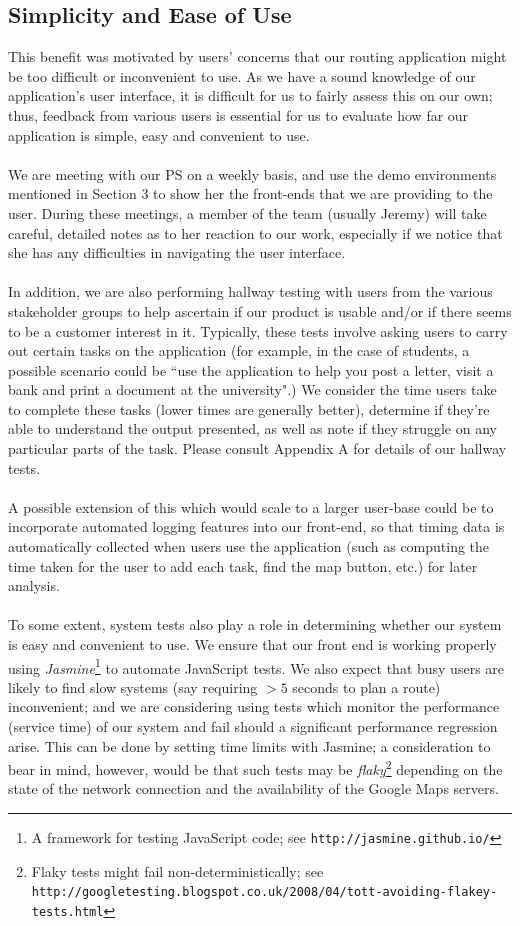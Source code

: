 \documentclass[a4paper, 10pt]{article}
\begin{document}
\subsection{Simplicity and Ease of Use}
This benefit was motivated by users' concerns that our routing application might be too difficult or inconvenient to use. As we have a sound knowledge of our application's user interface, it is difficult for us to fairly assess this on our own; thus, feedback from various users is essential for us to evaluate how far our application is simple, easy and convenient to use. \\\\
We are meeting with our PS on a weekly basis, and use the demo environments mentioned in Section 3 to show her the front-ends that we are providing to the user. During these meetings, a member of the team (usually Jeremy) will take careful, detailed notes as to her reaction to our work, especially if we notice that she has any difficulties in navigating the user interface. \\\\
In addition, we are also performing hallway testing with users from the various stakeholder groups to help ascertain if our product is usable and/or if there seems to be a customer interest in it. Typically, these tests involve asking users to carry out certain tasks on the application (for example, in the case of students, a possible scenario could be ``use the application to help you post a letter, visit a bank and print a document at the university".) We consider the time users take to complete these tasks (lower times are generally better), determine if they're able to understand the output presented, as well as note if they struggle on any particular parts of the task. Please consult Appendix A for details of our hallway tests. \\\\
A possible extension of this which would scale to a larger user-base could be to incorporate automated logging features into our front-end, so that timing data is automatically collected when users use the application (such as computing the time taken for the user to add each task, find the map button, etc.) for later analysis. \\\\
To some extent, system tests also play a role in determining whether our system is easy and convenient to use. We ensure that our front end is working properly using \textit{Jasmine}\footnote{A framework for testing JavaScript code; see \texttt{http://jasmine.github.io/}} to automate JavaScript tests. We also expect that busy users are likely to find slow systems (say requiring $>5$ seconds to plan a route) inconvenient; and we are considering using tests which monitor the performance (service time) of our system and fail should a significant performance regression arise. This can be done by setting time limits with Jasmine; a consideration to bear in mind, however, would be that such tests may be \textit{flaky}\footnote{Flaky tests might fail non-deterministically; see \texttt{http://googletesting.blogspot.co.uk/2008/04/tott-avoiding-flakey-tests.html}} depending on the state of the network connection and the availability of the Google Maps servers.
\end{document}

